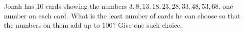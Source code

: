 Jonah has $10$ cards showing the numbers $3,8,13,18,23,28,33,48,53,68$, one number on each card. What is the least number of cards he can choose so that the numbers on them add up to $100$? Give one such choice.
